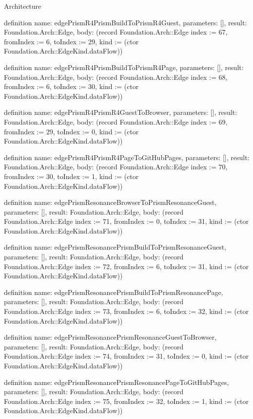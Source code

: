 \begin{lexlean}{Architecture}
\begin{semanticmodule}
definition{
  name: edgePrismR4PrismBuildToPrismR4Guest,
  parameters: [],
  result: Foundation.Arch::Edge,
  body: (record Foundation.Arch::Edge {index := 67, fromIndex := 6, toIndex := 29, kind := (ctor Foundation.Arch::EdgeKind.dataFlow)})
}

definition{
  name: edgePrismR4PrismBuildToPrismR4Page,
  parameters: [],
  result: Foundation.Arch::Edge,
  body: (record Foundation.Arch::Edge {index := 68, fromIndex := 6, toIndex := 30, kind := (ctor Foundation.Arch::EdgeKind.dataFlow)})
}

definition{
  name: edgePrismR4PrismR4GuestToBrowser,
  parameters: [],
  result: Foundation.Arch::Edge,
  body: (record Foundation.Arch::Edge {index := 69, fromIndex := 29, toIndex := 0, kind := (ctor Foundation.Arch::EdgeKind.dataFlow)})
}

definition{
  name: edgePrismR4PrismR4PageToGitHubPages,
  parameters: [],
  result: Foundation.Arch::Edge,
  body: (record Foundation.Arch::Edge {index := 70, fromIndex := 30, toIndex := 1, kind := (ctor Foundation.Arch::EdgeKind.dataFlow)})
}

definition{
  name: edgePrismResonanceBrowserToPrismResonanceGuest,
  parameters: [],
  result: Foundation.Arch::Edge,
  body: (record Foundation.Arch::Edge {index := 71, fromIndex := 0, toIndex := 31, kind := (ctor Foundation.Arch::EdgeKind.dataFlow)})
}

definition{
  name: edgePrismResonancePrismBuildToPrismResonanceGuest,
  parameters: [],
  result: Foundation.Arch::Edge,
  body: (record Foundation.Arch::Edge {index := 72, fromIndex := 6, toIndex := 31, kind := (ctor Foundation.Arch::EdgeKind.dataFlow)})
}

definition{
  name: edgePrismResonancePrismBuildToPrismResonancePage,
  parameters: [],
  result: Foundation.Arch::Edge,
  body: (record Foundation.Arch::Edge {index := 73, fromIndex := 6, toIndex := 32, kind := (ctor Foundation.Arch::EdgeKind.dataFlow)})
}

definition{
  name: edgePrismResonancePrismResonanceGuestToBrowser,
  parameters: [],
  result: Foundation.Arch::Edge,
  body: (record Foundation.Arch::Edge {index := 74, fromIndex := 31, toIndex := 0, kind := (ctor Foundation.Arch::EdgeKind.dataFlow)})
}

definition{
  name: edgePrismResonancePrismResonancePageToGitHubPages,
  parameters: [],
  result: Foundation.Arch::Edge,
  body: (record Foundation.Arch::Edge {index := 75, fromIndex := 32, toIndex := 1, kind := (ctor Foundation.Arch::EdgeKind.dataFlow)})
}


\end{semanticmodule}
\end{lexlean}
